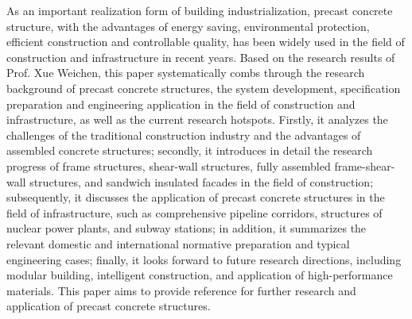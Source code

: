 \begin{eabstract}
As an important realization form of building industrialization, precast concrete structure, with the advantages of energy saving, environmental protection, efficient construction and controllable quality, has been widely used in the field of construction and infrastructure in recent years. Based on the research results of Prof. Xue Weichen, this paper systematically combs through the research background of precast concrete structures, the system development, specification preparation and engineering application in the field of construction and infrastructure, as well as the current research hotspots. Firstly, it analyzes the challenges of the traditional construction industry and the advantages of assembled concrete structures; secondly, it introduces in detail the research progress of frame structures, shear-wall structures, fully assembled frame-shear-wall structures, and sandwich insulated facades in the field of construction; subsequently, it discusses the application of precast concrete structures in the field of infrastructure, such as comprehensive pipeline corridors, structures of nuclear power plants, and subway stations; in addition, it summarizes the relevant domestic and international normative preparation and typical engineering cases; finally, it looks forward to future research directions, including modular building, intelligent construction, and application of high-performance materials. This paper aims to provide reference for further research and application of precast concrete structures.
\end{eabstract}

